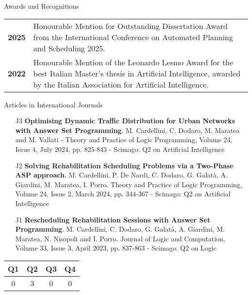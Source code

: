 \documentclass{resume} %
\begin{document}
 \begin{rSection}{Awards and Recognitions}
 \begin{tabularx}{0.95\textwidth} {lp{14cm}}
\textbf{2025} & Honourable Mention for Outstanding Dissertation Award from the International Conference on Automated Planning and Scheduling 2025.\\
\textbf{2022}  & Honourable Mention of the Leonardo Lesmo Award for the best Italian Master’s thesis in Artificial Intelligence, awarded by the Italian Association for Artificial Intelligence. 
  \end{tabularx}
\end{rSection}

\begin{rSection}{Articles in International Journals}
\begin{enumerate}[leftmargin=5mm]
	\item[J3] \textbf{Optimising Dynamic Traffic Distribution for Urban Networks with Answer Set Programming}. M. Cardellini, C. Dodaro, M. Maratea and M. Vallati - Theory and Practice of Logic Programming,  Volume 24, Issue 4, July 2024, pp. 825-843 - Scimago: Q2 on Artificial Intelligence
	\item[J2] \textbf{Solving Rehabilitation Scheduling Problems via a Two-Phase ASP approach}. M. Cardellini, P. De Nardi, C. Dodaro, G. Galat\`a, A. Giardini, M. Maratea, I. Porro. Theory and Practice of Logic Programming, Volume 24, Issue 2, March 2024, pp. 344-367 - Scimago: Q2 on Artificial Intelligence
	\item[J1] \textbf{Rescheduling Rehabilitation Sessions with Answer Set Programming}. M. Cardellini, C. Dodaro, G. Galat\`a, A. Giardini, M. Maratea, N. Nisopoli and I. Porro. Journal of Logic and Computation, Volume 33, Issue 3, April 2023, pp. 837-863 - Scimago: Q2 on Logic
\end{enumerate}

\begin{center}
\begin{tabular}{|c|c|c|c|}
	\hline
Q1 & Q2 & Q3 & Q4 \\ \hline
0 & 3 & 0 & 0 \\ \hline
\end{tabular}%
\end{center}
\end{rSection}
 
\end{document}
